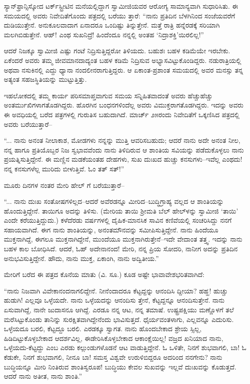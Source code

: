 ಸ್ಯಾನ್​ಫ್ರಾನ್ಸಿಸ್ಕೋದ ಟರ್ಕ್​ಸ್ಟ್ರೀಟಿನ ಮನೆಯಲ್ಲಿದ್ದಾಗ ಸ್ವಾಮೀಜಿಯವರ ಆರೋಗ್ಯ ಸಾಮಾನ್ಯವಾಗಿ ಸುಧಾರಿಸಿತು. ಈ ಸಮಯದಲ್ಲಿ ಅವರು ನಿವೇದಿತೆಗೊಂದು ಪತ್ರದಲ್ಲಿ ಬರೆಯು ತ್ತಾರೆ: “ನಾನು ಪ್ರತಿದಿನ ಬೆಳಗಿನಿಂದ ಸಂಜೆಯವರೆಗೆ ದುಡಿಯುತ್ತೇನೆ. ಅನುಕೂಲವಾದಾಗ ಏನಾದರೂ ಒಂದಿಷ್ಟು ತಿನ್ನುತ್ತೇನೆ. ಮತ್ತೆ ರಾತ್ರಿ ಹನ್ನೆರಡಕ್ಕೆ ಸರಿಯಾಗಿ ಮಲಗಿಬಿಡುತ್ತೇನೆ. ಆಹ್! ಎಂಥ ಸುಖನಿದ್ರೆ! ಹಿಂದೆಂದೂ ನನ್ನಲ್ಲಿ ಅಂತಹ ‘ನಿದ್ರಾಶಕ್ತಿ’ಯಿರಲಿಲ್ಲ!”

ಆದರೆ ನಿಜಕ್ಕೂ ಸ್ವಾಮೀಜಿ ಎಷ್ಟು ಗಂಟೆ ನಿದ್ರಿಸುತ್ತಿದ್ದರೋ ತಿಳಿಯದು. ಬಹುಶಃ ಬಹಳ ಕಡಿಮೆಯೇ ಇರಬೇಕು. ಏಕೆಂದರೆ ಅವರು ತಮ್ಮ ಜೀವಮಾನದಾದ್ಯಂತ ಬಹಳ ಕಡಿಮೆ ನಿದ್ರಿಸುವ ಅಭ್ಯಾಸವಿಟ್ಟುಕೊಂಡಿದ್ದರು. ನಡುರಾತ್ರಿಯಲ್ಲಿ ಅಥವಾ ನಸುಕಿನಲ್ಲಿ ಎದ್ದು ಧ್ಯಾನಾ ನಂದಲೀನರಾಗುತ್ತಿದ್ದರು. ಆ ಏಕಾಂತ-ಪ್ರಶಾಂತ ಸಮಯದಲ್ಲಿ ಅವರ ಮನಸ್ಸು ತನ್ನ ಅತ್ಯಂತ ಸಹಜಸ್ಥಿತಿಯನ್ನು ಮುಟ್ಟುತ್ತಿತ್ತು.

ಇಹಲೋಕದಲ್ಲಿ ತಮ್ಮ ಕಾರ್ಯ ಪರಿಸಮಾಪ್ತವಾಗುವ ಸಮಯ ಸನ್ನಿಹಿತವಾದಂತೆ ಅವರು ಹೆಚ್ಚುಹೆಚ್ಚು ಅಂತರ್ಮುಖಿಗಳಾಗತೊಡಗಿದ್ದರು. ಹೊರಗಿನ ಬಂಧನಗಳಿಂದೆಲ್ಲ ಅವರು ವಿಮುಕ್ತರಾಗತೊಡಗಿದ್ದರು. ಇದನ್ನು ಅವರು ಈ ಅವಧಿಯಲ್ಲಿ ಬರೆದ ಪತ್ರಗಳಲ್ಲಿ ಗುರುತಿಸ ಬಹುದಾಗಿದೆ. ಮಾರ್ಚ್ ೨೫ರಂದು ನಿವೇದಿತೆಗೆ ಒಕ್ಕಣಿಸಿದ ಪತ್ರದಲ್ಲಿ ಅವರು ಬರೆಯುತ್ತಾರೆ–

“... ನಾನು ಅನಂತ ನೀಲಾಕಾಶ, ಮೋಡಗಳು ನನ್ನನ್ನು ಮುತ್ತಿ ಆವರಿಸಬಹುದು; ಆದರೆ ನಾನು ಅದೇ ಅನಂತ ನೀಲ, ನನ್ನ ಹಾಗೂ ಪ್ರತಿಯೊಬ್ಬರ ನಿಜ ಸ್ವಭಾವವೆಂದು ನಾನು ತಿಳಿದಿರುವ ಆ ಶಾಂತಿಯ ಸವಿಯನ್ನು ಪಡೆದುಕೊಳ್ಳಲು ನಾನು ಪ್ರಯತ್ನಿಸುತ್ತಿದ್ದೇನೆ. ಈ ಮಣ್ಣಿನ ಮಡಕೆಯಂತಹ ದೇಹಗಳು, ಸುಖ ದುಃಖದ ಹುಚ್ಚು ಕನಸುಗಳು–ಇವೆಲ್ಲ ಎಂಥದು! ನನ್ನ ಕನಸುಗಳೆಲ್ಲ ಮುರಿದು ಬೀಳುತ್ತಿವೆ. ಓಂ ತತ್ ಸತ್!”

ಮೂರು ದಿನಗಳ ನಂತರ ಮೇರಿ ಹೇಲ್ ಗೆ ಬರೆಯುತ್ತಾರೆ–

“... ನಾನು ದುಃಖ ಸಂತೋಷಗಳಿಲ್ಲದ–ಆದರೆ ಅವೆರಡನ್ನೂ ಮೀರಿದ–ಬುದ್ಧಿಗ್ರಾಹ್ಯ ವಲ್ಲದ ಆ ಶಾಂತಿಯನ್ನು ಹೊಂದುತ್ತಿದ್ದೇನೆ. ತಾಯಿಗೂ ಅದನ್ನು ತಿಳಿಸು. (ಮೇರಿಯ ತಾಯಿ ಶ್ರೀಮತಿ ಬೆಲ್ ಹೇಲ್​ಳನ್ನು ಸ್ವಾಮೀಜಿ ‘ತಾಯಿ’ ಎಂದೇ ಕರೆಯುತ್ತಿದ್ದುದು.) ಕಳೆದೆರಡು ವರ್ಷಗಳಲ್ಲಿ ದೈಹಿಕ-ಮಾನಸಿಕ ಸಾವಿನ ಕಣಿವೆಯಲ್ಲಿ ಸಂಚರಿಸಿದ್ದು ನನಗೆ ಸಹಾಯವಾಗಿದೆ. ಈಗ ನಾನು ಶಾಂತಿಯನ್ನು, ಅನಂತಮೌನವನ್ನು ಸಮೀಪಿಸುತ್ತಿದ್ದೇನೆ. ನಾನು ಹಿಂದೆಯೂ ಮುಕ್ತನಾಗಿದ್ದೆ, ಈಗಲೂ ಮುಕ್ತನಾಗಿದ್ದೇನೆ, ಮುಂದೆಯೂ ಮುಕ್ತನಾಗಿರುತ್ತೇನೆ–ಇದೇ ವೇದಾಂತ ತತ್ತ್ವ. ಇದನ್ನು ನಾನು ಬಹಳ ಕಾಲ ಬೋಧಿಸಿದೆ. ಆದರೆ, ಓಹ್ ಅದೇನಾನಂದ! ಮೇರಿ, ನನ್ನ ಪ್ರಿಯ ಸೋದರಿ, ನಾನೀಗ ಅದನ್ನು ಪ್ರತಿದಿನ ಅನುಭವಿಸುತ್ತಿದ್ದೇನೆ. ಹೌದು, ನಾನು ಮುಕ್ತ, ಏಕಾಂಗಿ, ನಾನು ಅದ್ವಿತೀಯ.”

ಮೇರಿಗೆ ಬರೆದ ಈ ಪತ್ರದ ಕೊನೆಯ ಮಾತು (ವಿ. ಸೂ.) ಕೂಡ ಅಷ್ಟೇ ಭಾವಾವೇಶಭರಿತವಾಗಿದೆ:

“ನಾನು ನಿಜವಾಗಿ ವಿವೇಕಾನಂದನಾಗಲಿದ್ದೇನೆ. ನೀನೆಂದಾದರೂ ಕೆಟ್ಟದ್ದನ್ನು ಆನಂದಿಸಿ ದ್ದೀಯಾ? ಹಹ್ಹ! ಹುಚ್ಚು ಹುಡುಗಿ! ಎಲ್ಲವೂ ಒಳ್ಳೆಯದೇ. ನಾನು ಒಳ್ಳೆಯದನ್ನು ಆನಂದಿಸು ತ್ತೇನೆ, ಕೆಟ್ಟದ್ದನ್ನೂ ಆನಂದಿಸುತ್ತೇನೆ. ನಾನು ಏಸುವಾಗಿದ್ದೆ, ನಾನೇ ಜುದಾಸನೂ ಆಗಿದ್ದೆ. ಎರಡೂ ನನ್ನ ಆಟ, ನನ್ನ ತಮಾಷೆ. ಉಷ್ಟ್ರಪಕ್ಷಿಯು ಮಣ್ಣೊಳಗೆ ತಲೆ ಮರೆಸಿಟ್ಟುಕೊಂಡು ತಾನಿನ್ನು ಸುರಕ್ಷಿತವಾಗಿದ್ದೇನೆಂದು ಭಾವಿಸುತ್ತದೆ. ಧೈರ್ಯವಂತಳಾಗು, ಎಲ್ಲವನ್ನೂ ಎದುರಿಸು. ಒಳ್ಳೆಯದೂ ಬರಲಿ, ಕೆಟ್ಟದ್ದೂ ಬರಲಿ. ಎರಡಕ್ಕೂ ಸ್ವಾಗತ. ನಾನು ಹೊಂದಬೇಕಾದ ಶ್ರೇಯ ಸ್ಸಿಲ್ಲ, ಹಿಡಿದಿಟ್ಟುಕೊಳ್ಳಬೇಕಾದ ಆದರ್ಶವಿಲ್ಲ, ಈಡೇರಿಸಿಕೊಳ್ಳಬೇಕಾದ ಆಕಾಂಕ್ಷೆಯಿಲ್ಲ! ವಜ್ರದ ಖನಿಯಾದ ನಾನು, ಒಳ್ಳೆಯದು-ಕೆಟ್ಟದ್ದು ಎಂಬ ಎರಡು ಕಲ್ಗುಂಡುಗಳೊಡನೆ ಆಟ ವಾಡುತ್ತಿದ್ದೇನೆ. ಓ ಒಳಿತೇ, ನಿನಗೆ ಶುಭವಾಗಲಿ, ಬಾ! ಓ ಕೆಡುಕೇ, ನಿನಗೆ ಶುಭವಾಗಲಿ, ನೀನೂ ಬಾ! ಸಮಸ್ತ ವಿಶ್ವವೇ ಉರುಳಿಬಿದ್ದರೂ ಅದರಿಂದ ನನಗೇನು? ನಾನು ಬುದ್ಧಿಯನ್ನೂ ಮೀರಿ ನಿಂತಿರುವ ಶಾಂತಿಸ್ವರೂಪ! ಬುದ್ಧಿಯು ಕೇವಲ ಸುಖವನ್ನು ಇಲ್ಲವೆ ದುಃಖವನ್ನು ಕೊಡುತ್ತದೆ. ಆದರೆ ನಾನು ಅತೀತ, ನಾನು ಶಾಂತಿ.”

